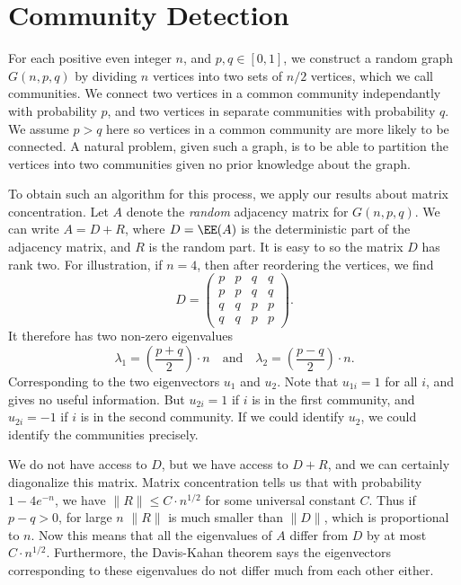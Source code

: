 \section{Community Detection}

For each positive even integer $n$, and $p,q \in [0,1]$, we construct a random graph $G(n,p,q)$ by dividing $n$ vertices into two sets of $n/2$ vertices, which we call communities. We connect two vertices in a common community independantly with probability $p$, and two vertices in separate communities with probability $q$. We assume $p > q$ here so vertices in a common community are more likely to be connected. A natural problem, given such a graph, is to be able to partition the vertices into two communities given no prior knowledge about the graph.

To obtain such an algorithm for this process, we apply our results about matrix concentration. Let $A$ denote the \emph{random} adjacency matrix for $G(n,p,q)$. We can write $A = D + R$, where $D = \EE(A)$ is the deterministic part of the adjacency matrix, and $R$ is the random part. It is easy to so the matrix $D$ has rank two. For illustration, if $n = 4$, then after reordering the vertices, we find
%
\[ D = \begin{pmatrix} p & p & q & q \\ p & p & q & q \\ q & q & p & p \\ q & q & p & p \end{pmatrix}. \]
%
It therefore has two non-zero eigenvalues
%
\[ \lambda_1 = \left( \frac{p + q}{2} \right) \cdot n\quad\text{and}\quad \lambda_2 = \left( \frac{p - q}{2} \right) \cdot n. \]
%
Corresponding to the two eigenvectors $u_1$ and $u_2$. Note that $u_{1i} = 1$ for all $i$, and gives no useful information. But $u_{2i} = 1$ if $i$ is in the first community, and $u_{2i} = -1$ if $i$ is in the second community. If we could identify $u_2$, we could identify the communities precisely.

We do not have access to $D$, but we have access to $D + R$, and we can certainly diagonalize this matrix. Matrix concentration tells us that with probability $1 - 4e^{-n}$, we have $\| R \| \leq C \cdot n^{1/2}$ for some universal constant $C$. Thus if $p - q > 0$, for large $n$ $\| R \|$ is much smaller than $\| D \|$, which is proportional to $n$. Now this means that all the eigenvalues of $A$ differ from $D$ by at most $C \cdot n^{1/2}$. Furthermore, the Davis-Kahan theorem says the eigenvectors corresponding to these eigenvalues do not differ much from each other either.

